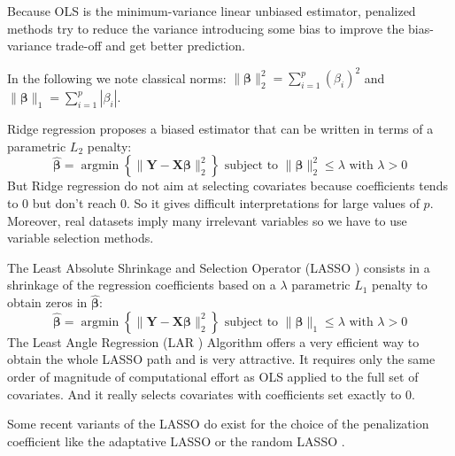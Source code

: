 \documentclass[11pt,a4paper]{article}
\begin{document}
	Because \textsc{OLS} is the minimum-variance linear unbiased estimator, penalized methods try to reduce the variance introducing some bias to improve the bias-variance trade-off and get better prediction.


In the following we note classical norms: $\parallel\boldsymbol{\beta}\parallel_2^2=\sum_{i=1}^p(\beta_i)^2$ and $\parallel\boldsymbol{\beta} \parallel_1=\sum_{i=1}^p|\beta_i| $.

	Ridge regression\cite{marquardt1975ridge} proposes a biased estimator that can be written in terms of a parametric $L_2$ penalty:
	\begin{equation}
		 \boldsymbol{\hat{\beta}}=\operatorname{argmin} \left\lbrace \parallel \boldsymbol{Y}-\boldsymbol{X\beta}\parallel_2^2 \right\rbrace \textrm{ subject to } \parallel \boldsymbol{\beta} \parallel_2^2\leq \lambda \textrm{ with } \lambda>0
	\end{equation}
	But Ridge regression do not aim at selecting covariates because coefficients tends to 0 but don't reach 0.
	So it gives difficult interpretations for large values of $p$.	
	Moreover, real datasets imply many irrelevant variables so we have to use variable selection methods.
	
	The Least Absolute Shrinkage and Selection Operator (\textsc{LASSO} \cite{tibshirani1996regression}) consists in a shrinkage of the regression coefficients based on a $\lambda$ parametric $L_1$ penalty to obtain zeros in $\hat{\boldsymbol{\beta}}$:
		\begin{equation}
		 \boldsymbol{\hat{\beta}}=\operatorname{argmin} \left\lbrace \parallel \boldsymbol{Y}-\boldsymbol{X\beta}\parallel_2^2 \right\rbrace \textrm{ subject to } \parallel\boldsymbol{\beta} \parallel_1\leq \lambda \textrm{ with } \lambda>0
		\end{equation}	
	 The Least Angle Regression (\textsc{LAR} \cite{efron2004least}) Algorithm offers a very efficient way to obtain the whole LASSO path and is very attractive. It requires only the same order of magnitude of computational effort as \textsc{OLS} applied to the full set of covariates. And it  really selects covariates with coefficients set exactly to 0.
	 
	 Some recent variants of the \textsc{LASSO} do exist for the choice of the penalization coefficient like the adaptative \textsc{LASSO} \cite{zou2006adaptive} or the random \textsc{LASSO} \cite{wang2011random}.
	 \\
	 
\end{document}
